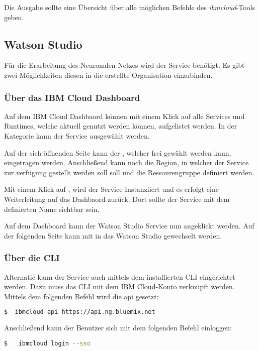 Die Ausgabe sollte eine Übersicht über alle möglichen Befehle des \textit{ibmcloud}-Tools geben.

\subsection{Watson Studio}
Für die Erarbeitung des Neuronalen Netzes wird der Service  benötigt. Es gibt zwei Möglichkeiten diesen
in die erstellte Organisation einzubinden.

\subsubsection*{Über das IBM Cloud Dashboard}
Auf dem IBM Cloud Dashbaord können mit einem Klick auf  alle Services und Runtimes, welche aktuell genutzt
werden können, aufgelistet werden. In der Kategorie  kann der Service 
ausgewählt werden.

Auf der sich öffnenden Seite kann der , welcher frei gewählt werden kann, eingetragen werden. Anschließend
kann noch die Region, in welcher der Service zur verfügung gestellt werden soll soll und die Ressourengruppe definiert werden.

Mit einem Klick auf , wird der Service Instanziiert und es erfolgt eine Weiterleitung auf das Dashbaord
zurück. Dort sollte der Service mit dem definierten Name sichtbar sein.

Auf dem Dashboard kann der Watson Studio Service nun angeklickt werden. Auf der folgenden Seite kann mit 
in das Watson Studio gewechselt werden.

\subsubsection*{Über die CLI}
Alternatic kann der Service auch mittels dem installierten CLI eingerichtet werden. Dazu muss das CLI mit dem IBM
Cloud-Konto verknüpft werden. Mittels dem folgenden Befehl wird die api gesetzt:

\begin{lstlisting}[language=bash, caption=Setzen des API Targets, label=Setzen des API Targets]
$  ibmcloud api https://api.ng.bluemix.net
\end{lstlisting}

Anschließend kann der Benutzer sich mit dem folgenden Befehl einloggen:

\begin{lstlisting}[language=bash, caption=Login über CLI und SSO, label=Login über CLI und SSO]
$   ibmcloud login --sso
\end{lstlisting}


